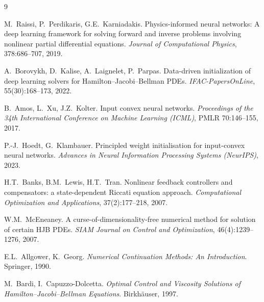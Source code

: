 \documentclass[11pt,a4paper]{article}
\begin{document}
\begin{thebibliography}{9}

M.~Raissi, P.~Perdikaris, G.E.~Karniadakis.
\newblock Physics-informed neural networks: A deep learning framework for
solving forward and inverse problems involving nonlinear partial
differential equations.
\newblock \emph{Journal of Computational Physics}, 378:686--707, 2019.

A.~Borovykh, D.~Kalise, A.~Laignelet, P.~Parpas.
\newblock Data-driven initialization of deep learning solvers for
Hamilton--Jacobi--Bellman PDEs.
\newblock \emph{IFAC-PapersOnLine}, 55(30):168--173, 2022.

B.~Amos, L.~Xu, J.Z.~Kolter.
\newblock Input convex neural networks.
\newblock \emph{Proceedings of the 34th International Conference on Machine
Learning (ICML)}, PMLR 70:146--155, 2017.

P.-J.~Hoedt, G.~Klambauer.
\newblock Principled weight initialisation for input-convex neural networks.
\newblock \emph{Advances in Neural Information Processing Systems
(NeurIPS)}, 2023.

H.T.~Banks, B.M.~Lewis, H.T.~Tran.
\newblock Nonlinear feedback controllers and compensators: a
state-dependent Riccati equation approach.
\newblock \emph{Computational Optimization and Applications},
37(2):177--218, 2007.

W.M.~McEneaney.
\newblock A curse-of-dimensionality-free numerical method for solution of
certain HJB PDEs.
\newblock \emph{SIAM Journal on Control and Optimization},
46(4):1239--1276, 2007.

E.L.~Allgower, K.~Georg.
\newblock \emph{Numerical Continuation Methods: An Introduction}.
\newblock Springer, 1990.

M.~Bardi, I.~Capuzzo-Dolcetta.
\newblock \emph{Optimal Control and Viscosity Solutions of
Hamilton--Jacobi--Bellman Equations}.
\newblock Birkh\"auser, 1997.

\end{thebibliography}
\end{document}
